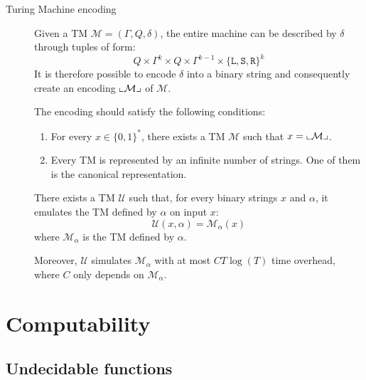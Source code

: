\begin{description}
    \item[Turing Machine encoding]
        Given a TM $\mathcal{M} = (\Gamma, Q, \delta)$, 
        the entire machine can be described by $\delta$ through tuples of form:
        \[ Q \times \Gamma^k \times Q \times \Gamma^{k-1} \times \{ \texttt{L}, \texttt{S}, \texttt{R} \}^k \]
        It is therefore possible to encode $\delta$ into a binary string and 
        consequently create an encoding ${\llcorner{\mathcal{M}}\lrcorner}$ of $\mathcal{M}$.

        The encoding should satisfy the following conditions:
        \begin{enumerate}
            \item For every $x \in \{0, 1\}^*$, there exists a TM $\mathcal{M}$ such that $x = {\llcorner{\mathcal{M}}\lrcorner}$.
            \item Every TM is represented by an infinite number of strings. One of them is the canonical representation.
        \end{enumerate}

    \begin{theorem} 
        There exists a TM $\mathcal{U}$ such that, for every binary strings $x$ and $\alpha$,
        it emulates the TM defined by $\alpha$ on input $x$:
        \[ \mathcal{U}(x, \alpha) = \mathcal{M}_\alpha(x) \]
        where $\mathcal{M}_\alpha$ is the TM defined by $\alpha$.

        Moreover, $\mathcal{U}$ simulates $\mathcal{M}_\alpha$ with at most $CT\log(T)$ time overhead,
        where $C$ only depends on $\mathcal{M}_\alpha$.
    \end{theorem}
\end{description}



\section{Computability}


\subsection{Undecidable functions}

